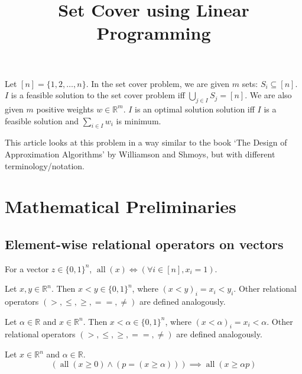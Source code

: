 

\title{Set Cover using Linear Programming}



\maketitle

Let $[n] = \{1, 2, \ldots, n\}$.
In the set cover problem, we are given $m$ sets: $S_i \subseteq [n]$.
$I$ is a feasible solution to the set cover problem iff $\bigcup_{j \in I} S_j = [n]$.
We are also given $m$ positive weights $w \in \mathbb{R}^m$.
$I$ is an optimal solution solution iff $I$ is a feasible solution and $\sum_{i \in I} w_i$ is minimum.

This article looks at this problem in a way similar to the book
`The Design of Approximation Algorithms' by Williamson and Shmoys,
but with different terminology/notation.

\tableofcontents
\initMinimal{}

\section{Mathematical Preliminaries}

\subsection{Element-wise relational operators on vectors}

\begin{definition}
For a vector $z \in \{0, 1\}^n$,
$\operatorname{all}(x) \iff (\forall i \in [n], x_i = 1)$.
\end{definition}

\begin{definition}
Let $x, y \in \mathbb{R}^n$. Then $x < y \in \{0, 1\}^n$, where $(x < y)_i = x_i < y_i$.
Other relational operators $(>, \le, \ge, ==, \neq)$ are defined analogously.
\end{definition}

\begin{definition}
Let $\alpha \in \mathbb{R}$ and $x \in \mathbb{R}^n$.
Then $x < \alpha \in \{0, 1\}^n$, where $(x < \alpha)_i = x_i < \alpha$.
Other relational operators $(>, \le, \ge, ==, \neq)$ are defined analogously.
\end{definition}

\begin{theorem}[Exercise]\label{rel-vec-thm-1}
Let $x \in \mathbb{R}^n$ and $\alpha \in \mathbb{R}$.
\[ (\operatorname{all}(x \ge 0) \wedge (p = (x \ge \alpha))) \implies \operatorname{all}(x \ge \alpha p) \]
\end{theorem}

